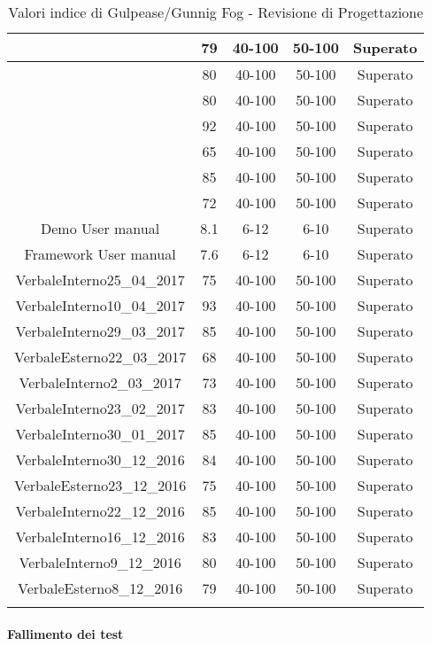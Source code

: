 \begin{longtable}{|c|c|c|c|c|}
	\hline \NormeDiProgetto{} & 79 & 40-100 & 50-100 & Superato\\
	\hline \PianoDiProgetto{} & 80 & 40-100 & 50-100 & Superato \\
	\hline \PianoDiQualifica{} & 80 & 40-100 & 50-100 & Superato \\
	\hline \AnalisiDeiRequisiti{} & 92 & 40-100 & 50-100 & Superato \\
	\hline \Glossario{} & 65 & 40-100 & 50-100 & Superato \\
	\hline \SpecificaTecnica{} & 85 & 40-100 & 50-100 & Superato\\
	\hline \DefinizioneDiProdotto{} & 72 & 40-100 & 50-100 & Superato\\
	\hline Demo User manual & 8.1 & 6-12 & 6-10 & Superato\\
	\hline Framework User manual & 7.6 & 6-12 & 6-10 & Superato\\
	\hline VerbaleInterno25\_04\_2017 & 75 & 40-100 & 50-100 & Superato \\
	\hline VerbaleInterno10\_04\_2017 & 93 & 40-100 & 50-100 & Superato \\
	\hline VerbaleInterno29\_03\_2017 & 85 & 40-100 & 50-100 & Superato \\
	\hline VerbaleEsterno22\_03\_2017 & 68 & 40-100 & 50-100 & Superato \\
	\hline VerbaleInterno2\_03\_2017 & 73 & 40-100 & 50-100 & Superato \\
	\hline VerbaleInterno23\_02\_2017 & 83 & 40-100 & 50-100 & Superato \\
	\hline VerbaleInterno30\_01\_2017 & 85 & 40-100 & 50-100 & Superato \\
	\hline VerbaleInterno30\_12\_2016 & 84 & 40-100 & 50-100 & Superato \\
	\hline VerbaleEsterno23\_12\_2016 & 75 & 40-100 & 50-100 & Superato \\
	\hline VerbaleInterno22\_12\_2016 & 85 & 40-100 & 50-100 & Superato \\
	\hline VerbaleInterno16\_12\_2016 & 83 & 40-100 & 50-100 & Superato \\
	\hline VerbaleInterno9\_12\_2016 & 80 & 40-100 & 50-100 & Superato \\
	\hline VerbaleEsterno8\_12\_2016 & 79 & 40-100 & 50-100 & Superato \\
	\hline
	\caption{Valori indice di Gulpease/Gunnig Fog - Revisione di Progettazione}
\end{longtable}


\paragraph{Fallimento dei test}\mbox{}\\


